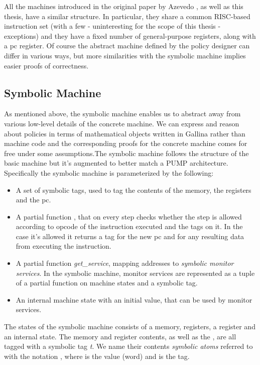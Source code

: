 All the machines introduced in the original paper by Azevedo \ETAL 
\cite{pump_popl2015}, 
as well as this thesis, have a similar structure. In particular, they share a
common RISC-based instruction set (with a few - uninteresting for the scope of
this thesis - exceptions) and they have a fixed number of general-purpose
registers, along with a pc register. Of course the abstract machine defined
by the policy designer can differ in various ways, but more similarities with
the symbolic machine implies easier proofs of correctness.


\subsection{Symbolic Machine}\label{sec:symbolic}

As mentioned above, the symbolic machine enables us to abstract away from 
various low-level details of the concrete machine. We can express and reason
about policies in terms of mathematical objects written in Gallina rather than
machine code and the corresponding proofs for the concrete machine comes for 
free under some assumptions.The symbolic machine follows the structure of the 
basic machine but it's augmented to better match a PUMP architecture. 
Specifically the symbolic machine is parameterized by the following:
\begin{itemize}
\item A set of symbolic tags, used to tag the contents of the memory, the
registers and the pc.
\item A partial function \TRANSFER, that on every step checks whether the
step is allowed according to opcode of the instruction executed and the tags on
it. In the case it's allowed it returns a tag for the new pc and for any 
resulting data from executing the instruction.
\item A partial function \textit{get\_service}, mapping addresses to 
\textit{symbolic monitor services}. In the symbolic machine, monitor services
are represented as a tuple of a partial function on machine states and a
symbolic tag.
\item An internal machine state with an initial value, that can be used by 
monitor services.
\end{itemize}

The states of the symbolic machine consists of a memory, registers, a \pc 
register and an internal state.
The memory  and register contents, as well as the \pc, are all tagged with a
symbolic tag \textit{t}. We name their contents \textit{symbolic atoms} referred
to with the notation , where  is the value (word) and
 is the tag.

